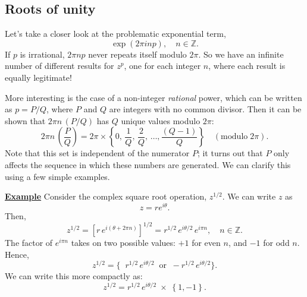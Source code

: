 \documentclass[10pt,a4paper]{article}
\begin{document}
\subsection{Roots of unity}
\label{roots-of-unity}

Let's take a closer look at the problematic exponential term,
\begin{equation}
  \exp\left(2\pi i np\right), \quad n \in \mathbb{Z}.
\end{equation}
If $p$ is irrational, $2\pi np$ never repeats itself modulo $2\pi$. So
we have an infinite number of different results for $z^p$, one for
each integer $n$, where each result is equally legitimate!

More interesting is the case of a non-integer \emph{rational} power,
which can be written as $p = P/Q$, where $P$ and $Q$ are integers with
no common divisor. Then it can be shown that $2\pi n\, (P/Q)$ has $Q$
unique values modulo $2\pi$:
\begin{equation}
  2\pi n\, \left(\frac{P}{Q}\right)
  = 2\pi \times \left\{0,\, \frac{1}{Q},\, \frac{2}{Q},\, \dots, \frac{(Q-1)}{Q} \right\} \quad(\mathrm{modulo} \; 2\pi).
\end{equation}
Note that this set is independent of the numerator $P$; it turns out
that $P$ only affects the sequence in which these numbers are
generated. We can clarify this using a few simple examples.

\begin{framed}
\label{square-root-example}
\noindent
\underline{\textbf{Example}}
\vskip 0.02in \noindent
Consider the complex square root operation, $z^{1/2}$. We can write
$z$ as
\begin{equation}
z = r e^{i\theta}.
\end{equation}
Then,
\begin{equation}
z^{1/2} = \left[r \, e^{i(\theta + 2 \pi n)} \right]^{1/2} = r^{1/2} \, e^{i\theta/2} \, e^{i \pi n}, \quad n \in \mathbb{Z}.
\end{equation}
The factor of $e^{i\pi n}$ takes on two possible values: $+1$ for
even $n$, and $-1$ for odd $n$. Hence,
\begin{equation}
z^{1/2} = \Big\{ \;\; r^{1/2} \, e^{i\theta/2} \;\; \mathrm{or} \;\;
-r^{1/2} \, e^{i\theta/2} \Big\}.
\end{equation}
We can write this more compactly as:
\begin{equation}
z^{1/2} = r^{1/2} \, e^{i\theta/2} \;\times\; \left\{1, -1\right\}.
\end{equation}
\end{framed}
\end{document}
